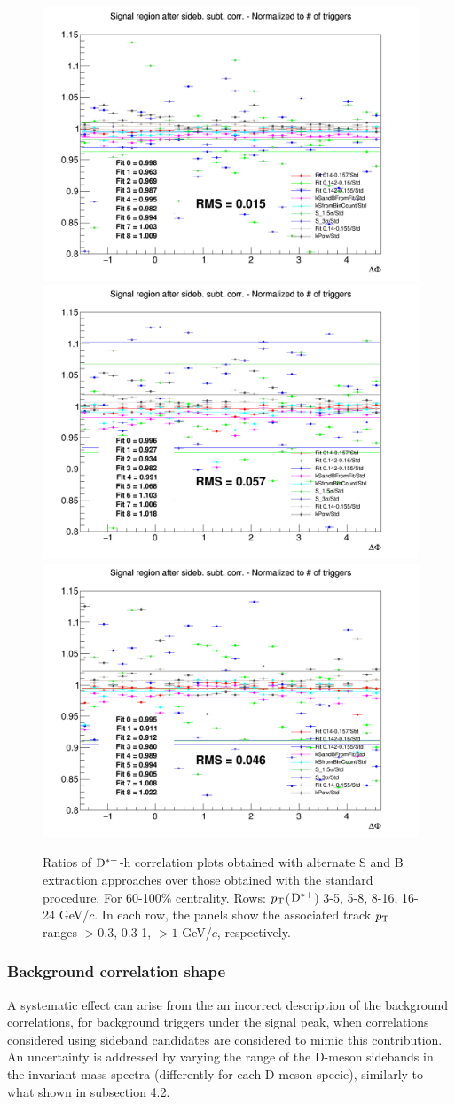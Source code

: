\begin{figure}
{\includegraphics[width=0.31\linewidth]{figuresVsCent/Dstar/SystSandB/60100_SandB_Syst/Ratio_AzimCorrDistr_Dstar_Canvas_PtIntBins10to10_PoolInt_thr03to99_YIELD_60100.png}}
{\includegraphics[width=0.31\linewidth]{figuresVsCent/Dstar/SystSandB/60100_SandB_Syst/Ratio_AzimCorrDistr_Dstar_Canvas_PtIntBins10to10_PoolInt_thr03to1_YIELD_60100.png}}
{\includegraphics[width=0.31\linewidth]{figuresVsCent/Dstar/SystSandB/60100_SandB_Syst/Ratio_AzimCorrDistr_Dstar_Canvas_PtIntBins10to10_PoolInt_thr1to99_YIELD_60100.png}} \\
 \caption{Ratios of ${\rm D^{*+}}$-h correlation plots obtained with alternate S and B extraction approaches over those obtained with the standard procedure. For 60-100\% centrality. Rows: $p_{\rm T}$(${\rm D^{*+}}$) 3-5, 5-8, 8-16, 16-24 GeV/$c$. In each row, the panels show the associated track
$p_{\rm T}$ ranges $> 0.3$, 0.3-1, $> 1$ GeV/$c$, respectively.}
\label{fig:SysSandB60100Dstar}
\end{figure}
\clearpage

\subsubsection{Background correlation shape}
A systematic effect can arise from the an incorrect description of the background correlations, for background triggers under the signal peak, when correlations considered using sideband candidates are considered to mimic this contribution. An uncertainty is addressed by varying the range of the D-meson sidebands in the invariant mass spectra (differently for each D-meson specie), similarly to what shown in subsection 4.2.

